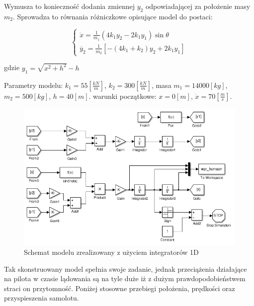 \documentclass[12pt]{article}
\begin{document}
Wymusza to konieczność dodania zmiennej $y_2$ odpowiadającej za położenie masy
$m_2$. Sprowadza to równania różniczkowe opisujące model do postaci:

\begin{equation}
	\begin{cases}
		\ddot{x} = \frac{1}{m_1}(4k_1y_2-2k_1y_1)\sin\theta \\
		\ddot{y_2} = \frac{1}{m_2}\left[-(4k_1+k_2)y_2+2k_1y_1\right]
	\end{cases}
\end{equation}

\vspace{0.5cm}

gdzie $y_1 = \sqrt{x^2+h^2} - h$

\vspace{0.5cm}

Parametry modelu: $k_1 = 55[\frac{kN}{m}]$, $k_2 = 300[\frac{kN}{m}]$, masa
$m_1 = 14000[kg]$, $m_2 = 500[kg]$, $h = 40[m]$. warunki początkowe: $x =
0[m]$, $\dot{x} = 70[\frac{m}{s}]$.
\newpage

\begin{figure}[!htb]
	\begin{center}
		\includegraphics[width=12cm]{../res/img/wpr_hamsam_mdl.png}
	\end{center} 
	\caption{Schemat modelu zrealizowany z użyciem integratorów 1D}
	\label{rys:wpr_hamsam_mdl}
\end{figure}

\vspace{0.5cm}

Tak skonstruowany model spełnia swoje zadanie, jednak przeciążenia działające na
pilota w czasie lądowania są na tyle duże iż z dużym prawdopodobieństwem
straci on przytomność. Poniżej stosowne przebiegi położenia, prędkości oraz
przyspieszenia samolotu.
\end{document}
